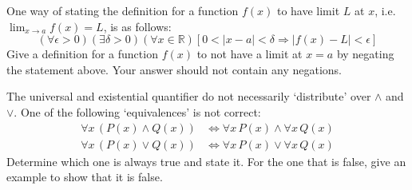 \documentclass[11pt,letterpaper]{article}
\begin{document}
\newpage





 One way of stating the definition for a function $f(x)$ to have limit $L$ at $x$, i.e. $\displaystyle \lim_{x \to a} f(x)= L$, is as follows:
	\[
	(\forall \epsilon > 0)(\exists \delta > 0)(\forall x \in \mathbb{R})[ 0 < |x - a| < \delta \Rightarrow |f(x) - L| < \epsilon]
	\]
Give a definition for a function $f(x)$ to not have a limit at $x= a$ by negating the statement above. Your answer should not contain any negations. \pspace





\newpage





 The universal and existential quantifier do not necessarily `distribute' over $\wedge$ and $\vee$. One of the following `equivalences' is not correct:
	\[
	\begin{aligned}
	\forall x\, (P(x) \wedge Q(x)) &\Longleftrightarrow \forall x\, P(x) \wedge \forall x\, Q(x) \\
	\forall x\, (P(x) \vee Q(x)) &\Longleftrightarrow \forall x\, P(x) \vee \forall x\, Q(x)
	\end{aligned}
	\]
Determine which one is always true and state it. For the one that is false, give an example to show that it is false. \pspace
\end{document}
